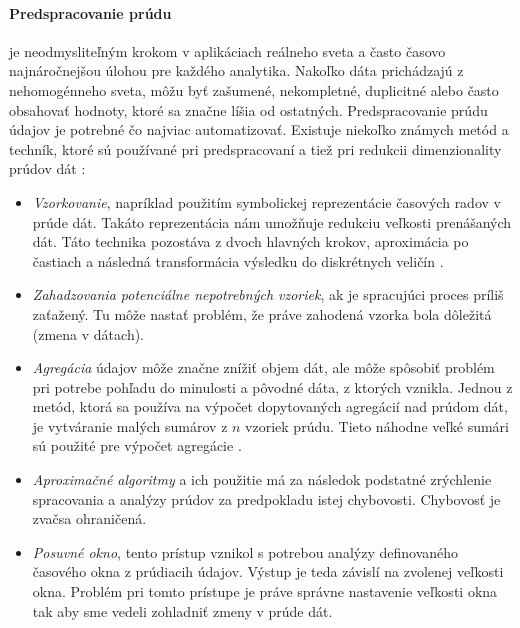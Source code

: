 \paragraph{Predspracovanie prúdu} je neodmysliteľným krokom v aplikáciach reálneho sveta a často časovo najnáročnejšou úlohou pre každého analytika. Nakoľko dáta prichádzajú z nehomogénneho sveta, môžu byť zašumené, nekompletné, duplicitné alebo často obsahovať hodnoty, ktoré sa značne líšia od ostatných. Predspracovanie prúdu údajov je potrebné čo najviac automatizovať. Existuje niekoľko známych metód a techník, ktoré sú používané pri predspracovaní a tiež pri redukcii dimenzionality prúdov dát \citep{krempl2014open, nguyen2015survey}:
\begin{itemize}
	\item \textit{Vzorkovanie}, napríklad použitím symbolickej reprezentácie časových radov v prúde dát. Takáto reprezentácia nám umožňuje redukciu veľkosti prenášaných dát. Táto technika pozostáva z dvoch hlavných krokov, aproximácia po častiach a následná transformácia výsledku do diskrétnych veličín \citep{sevcech2015symbolic}. 
	\item \textit{Zahadzovania potenciálne nepotrebných vzoriek}, ak je spracujúci proces príliš zaťažený. Tu môže nastať problém, že práve zahodená vzorka bola dôležitá (zmena v dátach).
	\item \textit{Agregácia} údajov môže značne znížiť objem dát, ale môže spôsobiť problém pri potrebe pohľadu do minulosti a pôvodné dáta, z ktorých vznikla. Jednou z metód, ktorá sa používa na výpočet dopytovaných agregácií nad prúdom dát, je vytváranie malých sumárov z $n$ vzoriek prúdu. Tieto náhodne veľké sumári sú použité pre výpočet agregácie \cite{dobra2002processing}.
	\item \textit{Aproximačné algoritmy} a ich použitie má za následok podstatné zrýchlenie spracovania a analýzy prúdov za predpokladu istej chybovosti. Chybovosť je zvačsa ohraničená.
	\item \textit{Posuvné okno}, tento prístup vznikol s potrebou analýzy definovaného časového okna z prúdiacih údajov. Výstup je teda závislí na zvolenej veľkosti okna. Problém pri tomto prístupe je práve správne nastavenie veľkosti okna tak aby sme vedeli zohladniť zmeny v prúde dát.
\end{itemize}

